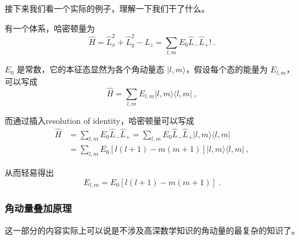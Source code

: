接下来我们看一个实际的例子，理解一下我们干了什么。

\begin{example}{}
有一个体系，哈密顿量为
\begin{equation}
\hat H = \hat L_x^2 + \hat L_y^2 -\hat  L_z = \sum_{l,m} E_0 \hat L_-\hat L_+!~.
\end{equation}

$E_0$ 是常数，它的本征态显然为各个角动量态 $|l,m\rangle$，假设每个态的能量为 $E_{l,m}$，可以写成
\begin{equation}
\hat H = \sum_{l,m}E_{l,m}|l,m\rangle\langle l,m|~,
\end{equation}

而通过插入resolution of identity，哈密顿量可以写成
\begin{equation}
\begin{split}
\hat H &= \sum_{l,m} E_0 \hat L_-\hat L_+ = \sum_{l,m} E_0 \hat L_-\hat L_+ |l,m\rangle \langle l,m|\\ &= \sum_{l,m} E_0 \left[l(l+1)-m(m+1)\right]|l,m\rangle \langle l,m|~,
\end{split}
\end{equation}

从而轻易得出
\begin{equation}
E_{l,m} = E_0 \left[l(l+1)-m(m+1)\right]~.
\end{equation}
\end{example}

\subsubsection{角动量叠加原理}

这一部分的内容实际上可以说是不涉及高深数学知识的角动量的最复杂的知识了。

